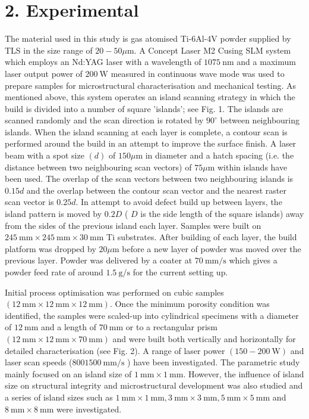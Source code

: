 \documentclass[10pt]{article}
\begin{document}
\section*{2. Experimental}
The material used in this study is gas atomised Ti-6Al-4V powder supplied by TLS in the size range of $20-50 \mu \mathrm{m}$. A Concept Laser M2 Cusing SLM system which employs an Nd:YAG laser with a wavelength of $1075 \mathrm{~nm}$ and a maximum laser output power of $200 \mathrm{~W}$ measured in continuous wave mode was used to prepare samples for microstructural characterisation and mechanical testing. As mentioned above, this system operates an island scanning strategy in which the build is divided into a number of square 'islands'; see Fig. 1. The islands are scanned randomly and the scan direction is rotated by $90^{\circ}$ between neighbouring islands. When the island scanning at each layer is complete, a contour scan is performed around the build in an attempt to improve the surface finish. A laser beam with a spot size $(d)$ of $150 \mu \mathrm{m}$ in diameter and a hatch spacing (i.e. the distance between two neighbouring scan vectors) of $75 \mu \mathrm{m}$ within islands have been used. The overlap of the scan vectors between two neighbouring islands is $0.15 d$ and the overlap between the contour scan vector and the nearest raster scan vector is $0.25 d$. In attempt to avoid defect build up between layers, the island pattern is moved by $0.2 D$ ( $D$ is the side length of the square islands) away from the sides of the previous island each layer. Samples were built on $245 \mathrm{~mm} \times 245 \mathrm{~mm} \times 30 \mathrm{~mm}$ Ti substrates. After building of each layer, the build platform was dropped by $20 \mu \mathrm{m}$ before a new layer of powder was moved over the previous layer. Powder was delivered by a coater at $70 \mathrm{~mm} / \mathrm{s}$ which gives a powder feed rate of around $1.5 \mathrm{~g} / \mathrm{s}$ for the current setting up.

Initial process optimisation was performed on cubic samples $(12 \mathrm{~mm} \times 12 \mathrm{~mm} \times 12 \mathrm{~mm})$. Once the minimum porosity condition was identified, the samples were scaled-up into cylindrical specimens with a diameter of $12 \mathrm{~mm}$ and a length of $70 \mathrm{~mm}$ or to a rectangular prism $(12 \mathrm{~mm} \times 12 \mathrm{~mm} \times 70 \mathrm{~mm})$ and were built both vertically and horizontally for detailed characterisation (see Fig. 2). A range of laser power $(150-200 \mathrm{~W})$ and laser scan speeds (800$1500 \mathrm{~mm} / \mathrm{s}$ ) have been investigated. The parametric study mainly focused on an island size of $1 \mathrm{~mm} \times 1 \mathrm{~mm}$. However, the influence of island size on structural integrity and microstructural development was also studied and a series of island sizes such as $1 \mathrm{~mm} \times 1 \mathrm{~mm}, 3 \mathrm{~mm} \times 3 \mathrm{~mm}, 5 \mathrm{~mm} \times 5 \mathrm{~mm}$ and $8 \mathrm{~mm} \times 8 \mathrm{~mm}$ were investigated.
\end{document}
